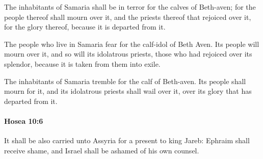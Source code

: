 			\begin{versebox}
					\item[BHS] 
					\item[LXX] 
					\item[ASV] The inhabitants of Samaria shall be in terror for the calves of Beth-aven; for the people thereof shall mourn over it, and the priests thereof that rejoiced over it, for the glory thereof, because it is departed from it.
					\item[NIV] The people who live in Samaria fear for the calf-idol of Beth Aven. Its people will mourn over it, and so will its idolatrous priests, those who had rejoiced over its splendor, because it is taken from them into exile.
					\item[NRSV] The inhabitants of Samaria tremble for the calf of Beth-aven. Its people shall mourn for it, and its idolatrous priests shall wail over it, over its glory that has departed from it.
			\end{versebox}

		\paragraph{Hosea 10:6} %
			\label{HOSEA-10-6}

			It shall be also carried unto Assyria for a present to king Jareb: Ephraim shall receive shame, and Israel shall be ashamed of his own counsel.

